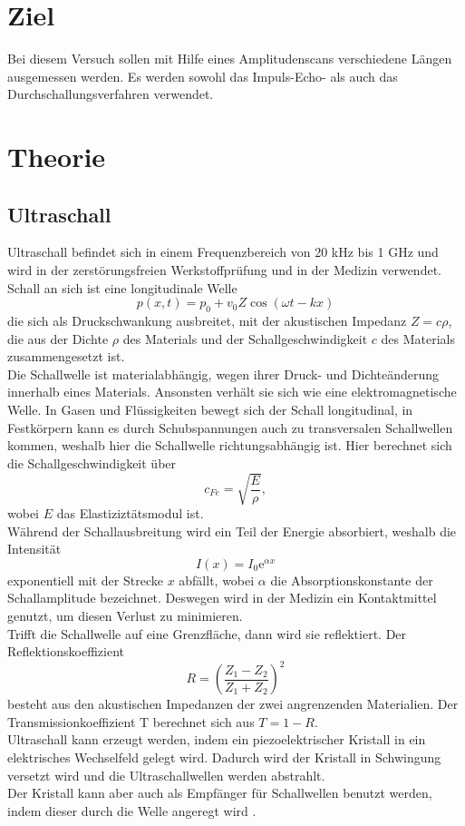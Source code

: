 \section{Ziel}
Bei diesem Versuch sollen mit Hilfe eines Amplitudenscans verschiedene Längen ausgemessen werden. Es werden sowohl das Impuls-Echo- als auch 
das Durchschallungsverfahren verwendet.

\section{Theorie}
\label{sec:Theorie}
\subsection{Ultraschall}
Ultraschall befindet sich in einem Frequenzbereich von 20 kHz bis 1 GHz und wird in der zerstörungsfreien Werkstoffprüfung und in der Medizin verwendet. Schall an sich ist eine longitudinale Welle
\begin{equation*}
  p(x,t)=p_0+v_0 Z \cos(\omega t-kx)
\end{equation*}
die sich als Druckschwankung ausbreitet, mit der akustischen Impedanz $Z=c\rho$, die aus der Dichte $\rho$ des Materials und der Schallgeschwindigkeit $c$ des Materials zusammengesetzt ist. \\
\noindent Die Schallwelle ist materialabhängig, wegen ihrer Druck- und Dichteänderung innerhalb eines Materials. Ansonsten verhält sie sich wie eine elektromagnetische Welle. In Gasen und Flüssigkeiten bewegt sich der Schall longitudinal, in Festkörpern kann es durch Schubspannungen auch zu transversalen Schallwellen kommen, weshalb hier die Schallwelle richtungsabhängig ist. Hier berechnet sich die Schallgeschwindigkeit über
\begin{equation*}
  c_{Fe}=\sqrt{\frac{E}{\rho}},
\end{equation*}
wobei $E$ das Elastiziztätsmodul ist.\\
Während der Schallausbreitung wird ein Teil der Energie absorbiert, weshalb die Intensität
\begin{equation*}
  I(x)=I_0 \textrm{e}^{\alpha x}
\end{equation*} 
exponentiell mit der Strecke $x$ abfällt, wobei $\alpha$ die Absorptionskonstante der Schallamplitude bezeichnet. Deswegen wird in der Medizin ein Kontaktmittel genutzt, um diesen Verlust zu minimieren.\\
Trifft die Schallwelle auf eine Grenzfläche, dann wird sie reflektiert. Der Reflektionskoeffizient
\begin{equation*}
  R=\left(\frac{Z_1-Z_2}{Z_1+Z_2}\right)^2
\end{equation*}
besteht aus den akustischen Impedanzen der zwei angrenzenden Materialien. Der Transmissionkoeffizient T berechnet sich aus $T=1-R$.\\
Ultraschall kann erzeugt werden, indem ein piezoelektrischer Kristall in ein elektrisches Wechselfeld gelegt wird. Dadurch wird der Kristall in Schwingung versetzt wird und die Ultraschallwellen werden abstrahlt. \\
Der Kristall kann aber auch als Empfänger für Schallwellen benutzt werden, indem dieser durch die Welle angeregt wird \cite{1}.


